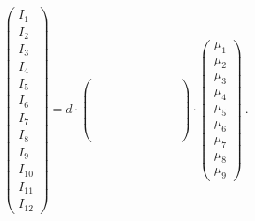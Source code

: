     \begin{equation}
        \begin{pmatrix}
            I_1 \\
            I_2 \\
            I_3 \\
            I_4 \\
            I_5 \\
            I_6 \\
            I_7 \\
            I_8 \\
            I_9 \\
            I_{10} \\
            I_{11} \\
            I_{12}
        \end{pmatrix}
        = d \cdot
        \begin{pmatrix}
             & & & & & & & &   \\
             & & & & & & & &   \\
             & & & & & & & &   \\
             & & & & & & & &   \\
             & & & & & & & &   \\
             & & & & & & & &   \\
             & & & & & & & &   \\
             & & & & & & & &   \\
             & & & & & & & &   \\
             & & & & & & & &   \\
             & & & & & & & &   \\
             & & & & & & & &
        \end{pmatrix}
        \cdot
        \begin{pmatrix}
            \mu_1 \\
            \mu_2 \\
            \mu_3 \\
            \mu_4 \\
            \mu_5 \\
            \mu_6 \\
            \mu_7 \\
            \mu_8 \\
            \mu_9
        \end{pmatrix}
        \ .
    \end{equation}

